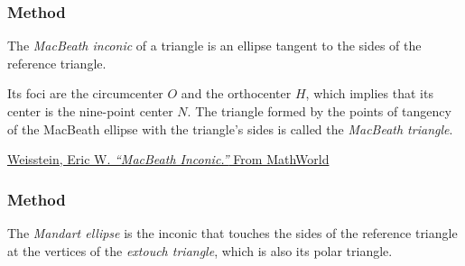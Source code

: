 

\subsubsection{Method } %
\label{ssub:method_triangle_macbeath__inellipse}

The \emph{MacBeath inconic} of a triangle is an ellipse tangent to the sides of the reference triangle.

\medskip
\noindent
Its foci are the circumcenter $O$ and the orthocenter $H$, which implies that its center is the nine-point center $N$. The triangle formed by the points of tangency of the MacBeath ellipse with the triangle's sides is called the \emph{MacBeath triangle}.

\begin{flushright}
  \small
\href{https://mathworld.wolfram.com/MacBeathInconic.html}{Weisstein, Eric W. \emph{“MacBeath Inconic.”} From MathWorld}
\end{flushright}

\vspace{1em}

\begin{tkzexample}[latex=.5\textwidth]
\end{tkzexample}


\subsubsection{Method } %
\label{ssub:method_triangle_mandart__inellipse}

The \emph{Mandart ellipse} is the inconic that touches the sides of the reference triangle at the vertices of the \emph{extouch triangle}, which is also its polar triangle.

